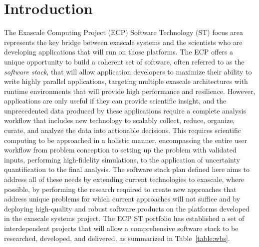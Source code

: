 \section{Introduction}\label{sect:intro}
The Exascale Computing Project (ECP) Software Technology (ST) focus area represents the key bridge between exascale systems and the scientists who are developing applications that will run on those platforms. The ECP offers a unique opportunity to build a coherent set of software, often referred to as the \textit{software stack}, that will allow application developers to maximize their ability to write highly parallel applications, targeting multiple exascale architectures with runtime environments that will provide high performance and resilience. However, applications are only useful if they can provide scientific insight, and the unprecedented data produced by these applications require a complete analysis workflow that includes new technology to scalably collect, reduce, organize, curate, and analyze the data into actionable decisions. This requires scientific computing to be approached in a holistic manner, encompassing the entire user workflow from problem conception to setting up the problem with validated inputs, performing high-fidelity simulations, to the application of uncertainty quantification to the final analysis. The software stack plan defined here aims to address all of these needs by extending current technologies to exascale, where possible, by performing the research required to create new approaches that address unique problems for which current approaches will not suffice and by deploying high-quality and robust software products on the platforms developed in the exascale systems project.
The ECP ST portfolio has established a set of interdependent projects that will allow a comprehensive software stack to be researched, developed, and delivered, as summarized in Table~\ref{table:wbs}.

